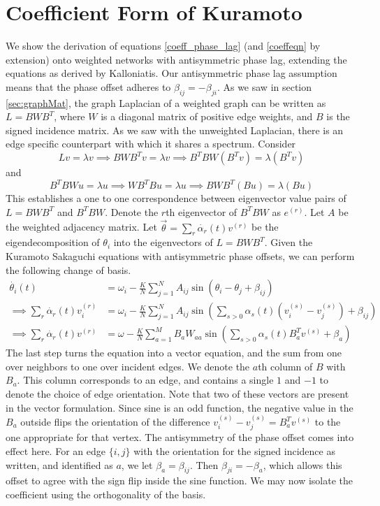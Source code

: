 \documentclass[%
 aip,
 amsmath,amssymb,
preprint,
reprint, onecolumn %
]{revtex4-1}
\begin{document}
\section{Coefficient Form of Kuramoto}\label{apdx:Coeff_Lapl}
    We show the derivation of equations \ref{coeff_phase_lag} (and \ref{coeffeqn} by extension) onto weighted networks with antisymmetric phase lag, extending the equations as derived by Kalloniatis.\cite{kalloniatis_incoherence_2010} Our antisymmetric phase lag assumption means that the phase offset adheres to $\beta_{ij}=-\beta_{ji}$. As we saw in section \ref{sec:graphMat}, the graph Laplacian of a weighted graph can be written as $L=BWB^T$, where $W$ is a diagonal matrix of positive edge weights, and $B$ is the signed incidence matrix. As we saw with the unweighted Laplacian, there is an edge specific counterpart with which it shares a spectrum. Consider
    \[
    Lv=\lambda v \implies BWB^T v= \lambda v\implies B^TBW\left(B^Tv\right)=\lambda \left(B^T v\right)
    \]
    and
    \[
    B^TBW u=\lambda u \implies W B^TB u=\lambda u \implies  B W B^T (B u)=\lambda (B u)
    \]
    This establishes a one to one correspondence between eigenvector value pairs of $L=BWB^T$ and $B^TBW$. Denote the $r$th eigenvector of $B^TBW$ as $e^{(r)}$.
    Let $A$ be the weighted adjacency matrix. Let $\vec{\theta}=\sum_r \dot{\alpha_r}(t)v^{(r)}$ be the eigendecomposition of $\theta_i$ into the eigenvectors of $L=BWB^T$. Given the Kuramoto Sakaguchi equations with antisymmetric phase offsets, we can perform the following change of basis. 
    \begin{align*}
        \dot{\theta_i}(t)&=\omega_i-\frac{K}{N}\sum_{j=1}^N A_{ij} \sin(\theta_i-\theta_j+ \beta_{ij})\\
        \implies \sum_r \dot{\alpha_r}(t)v_i^{(r)}&=\omega_i-\frac{K}{N}\sum_{j=1}^N A_{ij} \sin\left(\sum_{s>0} \alpha_s(t) (v_i^{(s)}-v_j^{(s)}) +\beta_{ij}\right)\\
        \implies \sum_{r} \dot{\alpha_r}(t)v^{(r)}&=\omega-\frac{K}{N}\sum_{a=1}^M B_{a} W_{aa} \sin\left(\sum_{s>0} \alpha_s(t) B_a^T v^{(s)} + \beta_a\right)
    \end{align*}
    The last step turns the equation into a vector equation, and the sum from one over neighbors to one over incident edges. We denote the $a$th column of $B$ with $B_a$. This column corresponds to an edge, and contains a single $1$ and $-1$ to denote the choice of edge orientation. Note that two of these vectors are present in the vector formulation. Since sine is an odd function, the negative value in the $B_a$ outside flips the orientation of the difference $v_i^{(s)}-v_j^{(s)}=B_a^Tv^{(s)}$ to the one appropriate for that vertex. The antisymmetry of the phase offset comes into effect here. For an edge $\{i,j\}$ with the orientation for the signed incidence as written, and identified as $a$, we let $\beta_a=\beta_{ij}$. Then $\beta_{ji}=-\beta_a$, which allows this offset to agree with the sign flip inside the sine function. We may now isolate the coefficient using the orthogonality of the basis.
\end{document}

